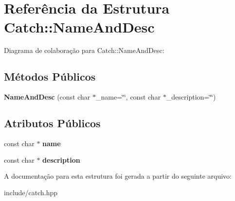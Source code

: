 \hypertarget{structCatch_1_1NameAndDesc}{}\section{Referência da Estrutura Catch\+:\+:Name\+And\+Desc}
\label{structCatch_1_1NameAndDesc}


Diagrama de colaboração para Catch\+:\+:Name\+And\+Desc\+:
\subsection*{Métodos Públicos}
\begin{DoxyCompactItemize}
\item 
{\bfseries Name\+And\+Desc} (const char $\ast$\+\_\+name=\char`\"{}\char`\"{}, const char $\ast$\+\_\+description=\char`\"{}\char`\"{})\hypertarget{structCatch_1_1NameAndDesc_a189ceb9942fb5f6635140d6a09fc843a}{}\label{structCatch_1_1NameAndDesc_a189ceb9942fb5f6635140d6a09fc843a}

\end{DoxyCompactItemize}
\subsection*{Atributos Públicos}
\begin{DoxyCompactItemize}
\item 
const char $\ast$ {\bfseries name}\hypertarget{structCatch_1_1NameAndDesc_a374b4ed8be3cf98be20ebde5273bde51}{}\label{structCatch_1_1NameAndDesc_a374b4ed8be3cf98be20ebde5273bde51}

\item 
const char $\ast$ {\bfseries description}\hypertarget{structCatch_1_1NameAndDesc_a3463a23ff65ce494fc380452b57b7970}{}\label{structCatch_1_1NameAndDesc_a3463a23ff65ce494fc380452b57b7970}

\end{DoxyCompactItemize}


A documentação para esta estrutura foi gerada a partir do seguinte arquivo\+:\begin{DoxyCompactItemize}
\item 
include/catch.\+hpp\end{DoxyCompactItemize}
